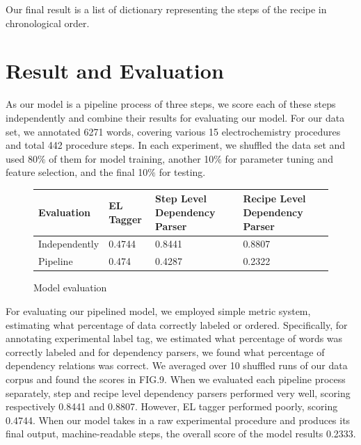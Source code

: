 Our final result is a list of dictionary representing the steps of the recipe in chronological order. 

\section{Result and Evaluation}

As our model is a pipeline process of three steps, we score each of these steps independently and combine their results for evaluating our model. For our data set, we annotated 6271 words, covering various 15 electrochemistry procedures and total 442 procedure steps.  In each experiment, we shuffled the data set and used 80$\%$ of them for model training, another 10$\%$ for parameter tuning and feature selection, and the final 10$\%$ for testing.  

\begin{figure}
  \centering
 	 \begin{tabular}{ |p{2.2cm}||p{2cm}|p{2cm}|p{2cm}|  }
	 \hline
	 Evaluation & EL Tagger & Step Level Dependency Parser & Recipe Level Dependency Parser\\
	 \hline
	Independently   & 0.4744 & 0.8441 &  0.8807\\
 	\hline
	Pipeline &  0.474  & 0.4287 & 0.2322\\
 	\hline
	\end{tabular}
	
  \caption{Model evaluation}
\end{figure}

For evaluating our pipelined model, we employed simple metric system, estimating what percentage of data correctly labeled or ordered. Specifically, for annotating experimental label tag, we estimated what percentage of words was correctly labeled and for dependency parsers, we found what percentage of dependency relations was correct. We averaged over 10 shuffled runs of our data corpus and found the scores in FIG.9. When we evaluated each pipeline process separately, step and recipe level dependency parsers performed very well, scoring respectively 0.8441 and 0.8807. However, EL tagger performed poorly, scoring 0.4744. When our model takes in a raw experimental procedure and produces its final output, machine-readable steps, the overall score of the model results 0.2333. 

